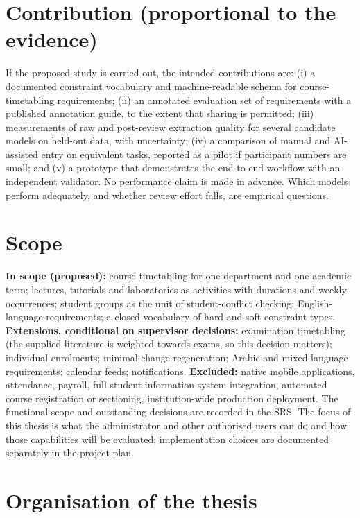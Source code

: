 \documentclass[
  11pt,a4paper,oneside]{report}
\begin{document}
\hypertarget{contribution-proportional-to-the-evidence}{%
\section{Contribution (proportional to the
evidence)}\label{contribution-proportional-to-the-evidence}}

If the proposed study is carried out, the intended contributions are:
(i) a documented constraint vocabulary and machine-readable schema for
course-timetabling requirements; (ii) an annotated evaluation set of
requirements with a published annotation guide, to the extent that
sharing is permitted; (iii) measurements of raw and post-review
extraction quality for several candidate models on held-out data, with
uncertainty; (iv) a comparison of manual and AI-assisted entry on
equivalent tasks, reported as a pilot if participant numbers are small;
and (v) a prototype that demonstrates the end-to-end workflow with an
independent validator. No performance claim is made in advance. Which
models perform adequately, and whether review effort falls, are
empirical questions.

\hypertarget{scope}{%
\section{Scope}\label{scope}}

\textbf{In scope (proposed):} course timetabling for one department and
one academic term; lectures, tutorials and laboratories as activities
with durations and weekly occurrences; student groups as the unit of
student-conflict checking; English-language requirements; a closed
vocabulary of hard and soft constraint types. \textbf{Extensions,
conditional on supervisor decisions:} examination timetabling (the
supplied literature is weighted towards exams, so this decision
matters); individual enrolments; minimal-change regeneration; Arabic and
mixed-language requirements; calendar feeds; notifications.
\textbf{Excluded:} native mobile applications, attendance, payroll, full
student-information-system integration, automated course registration or
sectioning, institution-wide production deployment. The functional scope and outstanding decisions are recorded in the SRS. The focus of this thesis is what the administrator and other authorised users can do and how those capabilities will be evaluated; implementation choices are documented separately in the project plan.

\hypertarget{organisation-of-the-thesis}{%
\section{Organisation of the thesis}\label{organisation-of-the-thesis}}
\end{document}
